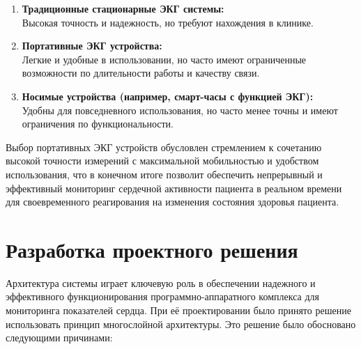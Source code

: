 \documentclass[12pt, russian]{extarticle}
\begin{document}
\begin{spacing}{1.5}
\begin{enumerate}
    \item \textbf{Традиционные стационарные ЭКГ системы:} \\
        Высокая точность и надежность, но требуют нахождения в клинике.
    \item \textbf{Портативные ЭКГ устройства:} \\
        Легкие и удобные в использовании, но часто имеют ограниченные возможности по длительности работы и качеству связи.
    \item \textbf{Носимые устройства (например, смарт-часы с функцией ЭКГ):} \\ 
        Удобны для повседневного использования, но часто менее точны и имеют ограничения по функциональности.
\end{enumerate}

Выбор портативных ЭКГ устройств обусловлен стремлением к сочетанию высокой точности измерений с максимальной мобильностью и удобством использования, что в конечном итоге позволит обеспечить непрерывный и эффективный мониторинг сердечной активности пациента в реальном времени для своевременного реагирования на изменения состояния здоровья пациента.

\newpage
\section{Разработка проектного решения}

Архитектура системы играет ключевую роль в обеспечении надежного и эффективного функционирования программно-аппаратного комплекса для мониторинга показателей сердца. При её проектировании было принято решение использовать принцип многослойной архитектуры. Это решение было обосновано следующими причинами:


\end{spacing}
\end{document}
